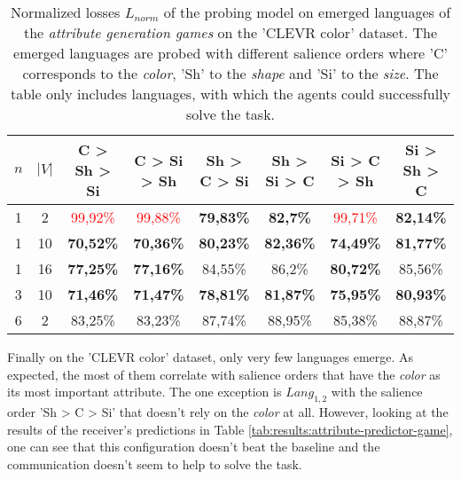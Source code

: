 \begin{table}[ht]
    \centering
    \begin{tabular}{cc|c|c|c|c|c|c}
        \toprule
        $n$ & $|V|$ & \textbf{C > Sh > Si}     & \textbf{C > Si > Sh}     & \textbf{Sh > C > Si} & \textbf{Sh > Si > C} & \textbf{Si > C > Sh}     & \textbf{Si > Sh > C} \\\midrule
        {1} & {2}   & \textcolor{red}{99,92\%} & \textcolor{red}{99,88\%} & \textbf{79,83\%}     & \textbf{82,7\%}      & \textcolor{red}{99,71\%} & \textbf{82,14\%}     \\
        {1} & {10}  & \textbf{70,52\%}         & \textbf{70,36\%}         & \textbf{80,23\%}     & \textbf{82,36\%}     & \textbf{74,49\%}         & \textbf{81,77\%}     \\
        {1} & {16}  & \textbf{77,25\%}         & \textbf{77,16\%}         & {84,55\%}            & {86,2\%}             & \textbf{80,72\%}         & {85,56\%}            \\
        {3} & {10}  & \textbf{71,46\%}         & \textbf{71,47\%}         & \textbf{78,81\%}     & \textbf{81,87\%}     & \textbf{75,95\%}         & \textbf{80,93\%}     \\
        {6} & {2}   & {83,25\%}                & {83,23\%}                & {87,74\%}            & {88,95\%}            & {85,38\%}                & {88,87\%}            \\
        \bottomrule
    \end{tabular}
    \caption{Normalized losses $L_{norm}$ of the probing model on emerged languages of the \emph{attribute generation games} on the 'CLEVR color' dataset. The emerged languages are probed with different salience orders where 'C' corresponds to the \emph{color}, 'Sh' to the \emph{shape} and 'Si' to the \emph{size}. The table only includes languages, with which the agents could successfully solve the task.}
    \label{tab:probing:attribute-generator:colour}
\end{table}

Finally on the 'CLEVR color' dataset, only very few languages emerge.
As expected, the most of them correlate with salience orders that have the \emph{color} as its most important attribute.
The one exception is $Lang_{1,2}$ with the salience order 'Sh > C > Si' that doesn't rely on the \emph{color} at all.
However, looking at the results of the receiver's predictions in Table \ref{tab:results:attribute-predictor-game}, one can see that this configuration doesn't beat the baseline and the communication doesn't seem to help to solve the task.

